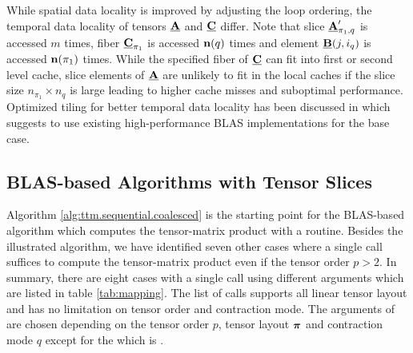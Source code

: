 While spatial data locality is improved by adjusting the loop ordering, the temporal data locality of tensors $\underline{\mathbf{A}}$ and $\underline{\mathbf{C}}$ differ.
Note that slice $\underline{\mathbf{A}}_{\pi_1,q}'$ is accessed $m$ times, fiber $\underline{\mathbf{C}}_{\pi_1}$ is accessed $\mathbf{n}(q)$ times and element $\underline{\mathbf{B}}(j,i_q)$ is accessed $\mathbf{n}(\pi_1)$ times.
While the specified fiber of $\underline{\mathbf{C}}$ can fit into first or second level cache, slice elements of $\underline{\mathbf{A}}$ are unlikely to fit in the local caches if the slice size $n_{\pi_1} \times n_q$ is large leading to higher cache misses and suboptimal performance.
Optimized tiling for better temporal data locality has been discussed in \cite{goto:2008:gemm} which suggests to use existing high-performance BLAS implementations for the base case.

\subsection{BLAS-based Algorithms with Tensor Slices}
\label{sec:design:blas.based.algorithm}
Algorithm \ref{alg:ttm.sequential.coalesced} is the starting point for the BLAS-based algorithm which computes the tensor-matrix product with a  routine.
Besides the illustrated algorithm, we have identified seven other cases where a single  call suffices to compute the tensor-matrix product even if the tensor order $p>2$.
In summary, there are eight cases with a single  call using different arguments which are listed in table \ref{tab:mapping}.
The list of  calls supports all linear tensor layout and has no limitation on tensor order and contraction mode.
The arguments of  are chosen depending on the tensor order $p$, tensor layout $\boldsymbol{\pi}$ and contraction mode $q$ except for the  which is .

